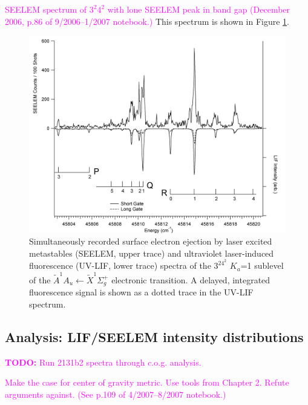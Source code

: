 \documentclass[12pt,draft]{mitthesis}
\newcommand{\TODO} [1]{\textcolor{magenta}{\textbf{TODO:} #1}}
\newcommand{\POINT}[1]{\textcolor{magenta}{#1}}
\begin{document}
\POINT{SEELEM spectrum of $3^2 4^2$ with lone SEELEM peak in band gap
  (December 2006, p.86 of 9/2006--1/2007 notebook.)}  This spectrum is
shown in Figure \ref{fig:spectrum-32b2}.

\begin{figure}
  \caption{
    Simultaneously recorded surface electron ejection by laser excited
    metastables (SEELEM, upper trace) and ultraviolet laser-induced
    fluorescence (UV-LIF, lower trace) spectra of the $3^24^2$ $K_a$=1
    sublevel of the $\tilde{A}^1A_u \leftarrow \tilde{X} ^1\Sigma_g^+$
    electronic transition. A delayed, integrated fluorescence signal
    is shown as a dotted trace in the UV-LIF spectrum.}
  \label{fig:spectrum-32b2}
  \centering
  \includegraphics[width=7.5in,angle=90]{spectrum-32b2.png}
\end{figure}

\subsection{Analysis: LIF/SEELEM intensity distributions}

\TODO{Run 2131b2 spectra through c.o.g. analysis.}

\POINT{Make the case for center of gravity metric. Use tools from
  Chapter 2.  Refute arguments against.  (See p.109 of 4/2007--8/2007
  notebook.)}

\end{document}
